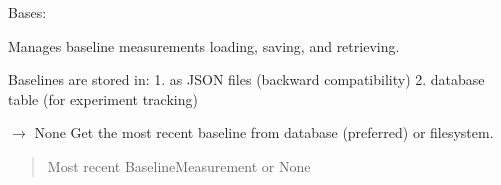 \documentclass[letterpaper,10pt,english]{sphinxmanual}
\begin{document}
\begin{fulllineitems}
\label{\detokenize{core.utils.baseline_manager:core.utils.baseline_manager.BaselineManager}}
\pysigstartsignatures
\pysiglinewithargsret
{}
{}
{}
\pysigstopsignatures
\sphinxAtStartPar
Bases: 

\sphinxAtStartPar
Manages baseline measurements \textendash{} loading, saving, and retrieving.

\sphinxAtStartPar
Baselines are stored in:
1.  as JSON files (backward compatibility)
2.  database table (for experiment tracking)

\begin{fulllineitems}
\label{\detokenize{core.utils.baseline_manager:core.utils.baseline_manager.BaselineManager.get_latest}}
\pysigstartsignatures
\pysiglinewithargsret
{}
{}
{{ $\rightarrow$ {\hyperref[\detokenize{core.models.baseline_measurement:core.models.baseline_measurement.BaselineMeasurement}]{}}None}}
\pysigstopsignatures
\sphinxAtStartPar
Get the most recent baseline from database (preferred) or filesystem.
\begin{quote}\begin{description}
\sphinxAtStartPar
Most recent BaselineMeasurement or None

\end{description}\end{quote}

\end{fulllineitems}



\end{fulllineitems}
\end{document}
